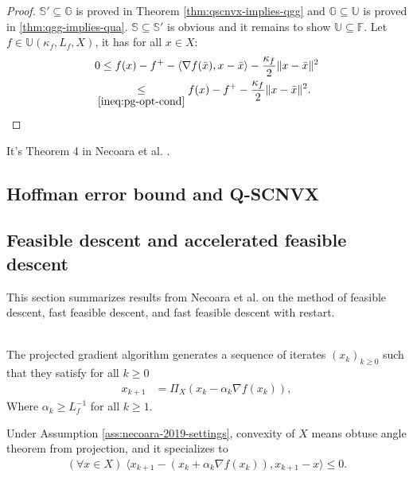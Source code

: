\documentclass[12pt]{report}
\begin{document}
            \begin{proof}
                $\mathbb S' \subseteq \mathbb G$ is proved in Theorem \ref{thm:qscnvx-implies-qgg} and $\mathbb G \subseteq \mathbb U$ is proved in \ref{thm:qgg-implies-qua}. 
                $\mathbb S\subseteq \mathbb S'$ is obvious and it remains to show $\mathbb U \subseteq \mathbb F$. 
                Let $f\in \mathbb U(\kappa_f, L_f, X)$, it has for all $x \in X$: 
                \begin{align*}
                    0 &\le f(x) - f^+ - \langle \nabla f(\bar x), x - \bar x\rangle - \frac{\kappa_f}{2}\Vert x - \bar x\Vert^2
                    \\
                    &\hspace{-0.5em}\underset{\eqref{ineq:pg-opt-cond}}{\le} 
                    f(x) - f^+ - \frac{\kappa_f}{2}\Vert x - \bar x\Vert^2. 
                \end{align*}
            \end{proof}
            \begin{remark}
                It's Theorem 4 in Necoara et al. \cite{necoara_linear_2019}.
            \end{remark}
        \subsection{Hoffman error bound and Q-SCNVX}

        \subsection{Feasible descent and accelerated feasible descent}
            This section summarizes results from Necoara et al. on the method of feasible descent, fast feasible descent, and fast feasible descent with restart. 
            \begin{definition}\label{def:projg-alg}\;\\
                The projected gradient algorithm generates a sequence of iterates $(x_k)_{k \ge 0}$ such that they satisfy for all $k \ge 0$
                \begin{align*}
                    x_{k + 1} &= \Pi_X(x_k - \alpha_k \nabla f(x_k)), 
                \end{align*}
                Where $\alpha_k \ge L_f^{-1}$ for all $k \ge 1$. 
            \end{definition}
            Under Assumption \ref{ass:necoara-2019-settings}, convexity of $X$ means obtuse angle theorem from projection, and it specializes to 
            \begin{align}\label{ineq:projg-variational-ineq}
                (\forall x \in X)\; \langle x_{k + 1} - (x_k + \alpha_k \nabla f(x_k)), x_{k + 1} - x\rangle \le 0. 
            \end{align}
\end{document}
